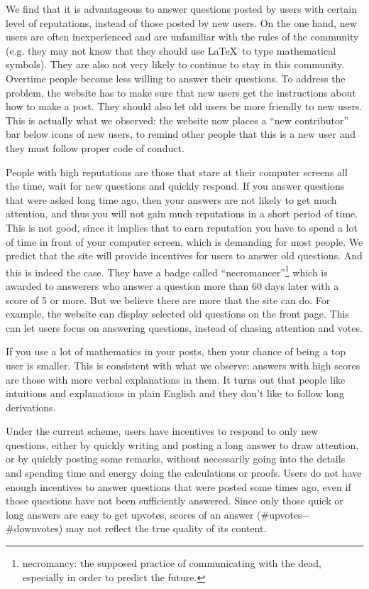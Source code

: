 \documentclass[12pt]{article}
\begin{document}
\item We find that it is advantageous to answer questions posted by users with certain level of reputations, instead of those posted by new users. On the one hand, new users are often inexperienced and are unfamiliar with the rules of the community (e.g. they may not know that they should use \LaTeX~to type mathematical symbols). They are also not very likely to continue to stay in this community. Overtime people become less willing to answer their questions. To address the problem, the website has to make sure that new users get the instructions about how to make a post. They should also let old users be more friendly to new users. This is actually what we observed: the website now places a ``new contributor'' bar below icons of new users, to remind other people that this is a new user and they must follow proper code of conduct.

\item People with high reputations are those that stare at their computer screens all the time, wait for new questions and quickly respond. If you answer questions that were asked long time ago, then your answers are not likely to get much attention, and thus you will not gain much reputations in a short period of time. This is not good, since it implies that to earn reputation you have to spend a lot of time in front of your computer screen, which is demanding for most people. We predict that the site will provide incentives for users to answer old questions. And this is indeed the case. They have a badge called ``necromancer''\footnote{necromancy: the supposed practice of communicating with the dead, especially in order to predict the future.} which is awarded to answerers who answer a question more than 60 days later with a score of 5 or more. But we believe there are more that the site can do. For example, the website can display selected old questions on the front page. This can let users focus on answering questions, instead of chasing attention and votes.

\item If you use a lot of mathematics in your posts, then your chance of being a top user is smaller. This is consistent with what we observe: answers with high scores are those with more verbal explanations in them. It turns out that people like intuitions and explanations in plain English and they don't like to follow long derivations.
\ei

Under the current scheme, users have incentives to respond to only new questions, either by quickly writing and posting a long answer to draw attention, or by quickly posting some remarks, without necessarily going into the details and spending time and energy doing the calculations or proofs. Users do not have enough incentives to answer questions that were posted some times ago, even if those questions have not been sufficiently answered. Since only those quick or long answers are easy to get upvotes, scores of an answer (\#upvotes$-$\#downvotes) may not reflect the true quality of its content. 
\end{document}
